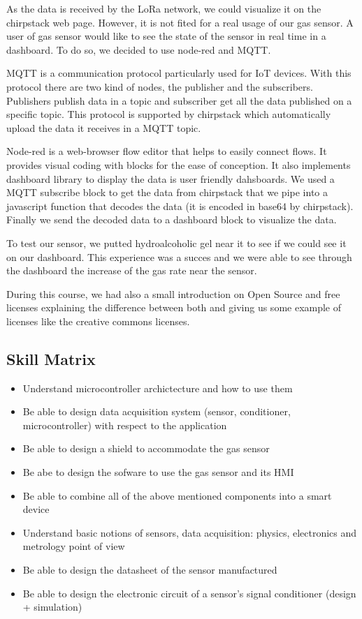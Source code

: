 As the data is received by the LoRa network, we could visualize it on the chirpstack web page. However, it is not fited for a real usage of our gas sensor. A user of gas sensor would like to see the state of the sensor in real time in a dashboard. To do so, we decided to use node-red and MQTT.
\par
MQTT is a communication protocol particularly used for IoT devices. With this protocol there are two kind of nodes, the publisher and the subscribers. Publishers publish data in a topic and subscriber get all the data published on a specific topic. This protocol is supported by chirpstack which automatically upload the data it receives in a MQTT topic.
\par
Node-red is a web-browser flow editor that helps to easily connect flows. It provides visual coding with blocks for the ease of conception. It also implements dashboard library to display the data is user friendly dahsboards. We used a MQTT subscribe block to get the data from chirpstack that we pipe into a javascript function that decodes the data (it is encoded in base64 by chirpstack). Finally we send the decoded data to a dashboard block to visualize the data.
\par
To test our sensor, we putted hydroalcoholic gel near it to see if we could see it on our dashboard. This experience was a succes and we were able to see through the dashboard the increase of the gas rate near the sensor.
\\\par

During this course, we had also a small introduction on Open Source and free licenses explaining the difference between both and giving us some example of licenses like the creative commons licenses. 

\subsection{Skill Matrix}

\begin{itemize}
    \item Understand microcontroller archictecture and how to use them
    \item Be able to design data acquisition system (sensor, conditioner, microcontroller) with respect to the application
    \item Be able to design a shield to accommodate the gas sensor
    \item Be abe to design the sofware to use the gas sensor and its HMI
    \item Be able to combine all of the above mentioned components into a smart device
    \item Understand basic notions of sensors, data acquisition: physics, electronics and metrology point of view
    \item Be able to design the datasheet of the sensor manufactured
    \item Be able to design the electronic circuit of a sensor’s signal conditioner (design + simulation)
\end{itemize}

